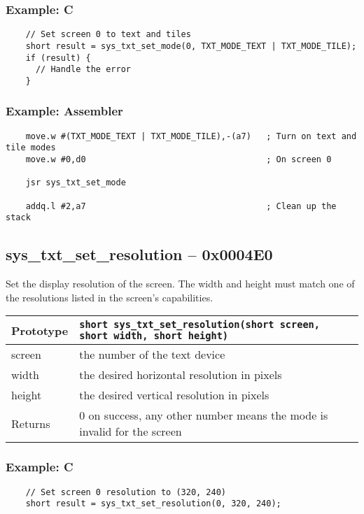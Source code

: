 \subsubsection*{Example: C}
\begin{lstlisting}
    // Set screen 0 to text and tiles
    short result = sys_txt_set_mode(0, TXT_MODE_TEXT | TXT_MODE_TILE);
    if (result) {
      // Handle the error
    }    
\end{lstlisting}

\subsubsection*{Example: Assembler}
\begin{verbatim}
    move.w #(TXT_MODE_TEXT | TXT_MODE_TILE),-(a7)   ; Turn on text and tile modes
    move.w #0,d0                                	; On screen 0
    
    jsr sys_txt_set_mode

    addq.l #2,a7                                   	; Clean up the stack
\end{verbatim}

\subsection*{sys\_txt\_set\_resolution -- 0x0004E0}
Set the display resolution of the screen.
The width and height must match one of the resolutions listed in the screen's capabilities.

\bigskip

\begin{tabular}{|l||l|} \hline
Prototype & \lstinline!short sys_txt_set_resolution(short screen, short width, short height)! \\ \hline
screen & the number of the text device \\ \hline
width & the desired horizontal resolution in pixels \\ \hline
height & the desired vertical resolution in pixels \\ \hline
Returns & 0 on success, any other number means the mode is invalid for the screen \\ \hline
\end{tabular}

\subsubsection*{Example: C}
\begin{lstlisting}
    // Set screen 0 resolution to (320, 240)
    short result = sys_txt_set_resolution(0, 320, 240);
\end{lstlisting}

